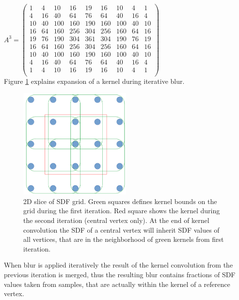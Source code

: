 $A^3 = 
\begin{pmatrix}
1 & 4 & 10 & 16 & 19 & 16 & 10 & 4 & 1\\
4 & 16 & 40 & 64 & 76 & 64 & 40 & 16 & 4\\
10 & 40 & 100 & 160 & 190 & 160 & 100 & 40 & 10\\
16 & 64 & 160 & 256 & 304 & 256 & 160 & 64 & 16\\
19 & 76 & 190 & 304 & 361 & 304 & 190 & 76 & 19\\
16 & 64 & 160 & 256 & 304 & 256 & 160 & 64 & 16\\
10 & 40 & 100 & 160 & 190 & 160 & 100 & 40 & 10\\
4 & 16 & 40 & 64 & 76 & 64 & 40 & 16 & 4\\
1 & 4 & 10 & 16 & 19 & 16 & 10 & 4 & 1\\
\end{pmatrix}$\\
Figure \ref{fig:iterativeKernelExpansion} explains expansion of a kernel during iterative blur.
\begin{figure}
	\begin{center}
   		\includegraphics[width=0.5\textwidth]{figures/IterativeKernelCalculationExample.png}
	\end{center}
	\caption{2D slice of SDF grid. Green squares defines kernel bounds on the grid during the first iteration. Red square shows the kernel during the second iteration (central vertex only). At the end of kernel convolution the SDF of a central vertex will inherit SDF values of all vertices, that are in the neighborhood of green kernels from first iteration.}
   \label{fig:iterativeKernelExpansion}
\end{figure}

When blur is applied iteratively the result of the kernel convolution from the previous iteration is merged, thus the resulting blur contains fractions of SDF values taken from samples, that are actually within the kernel of a  reference vertex.\\

